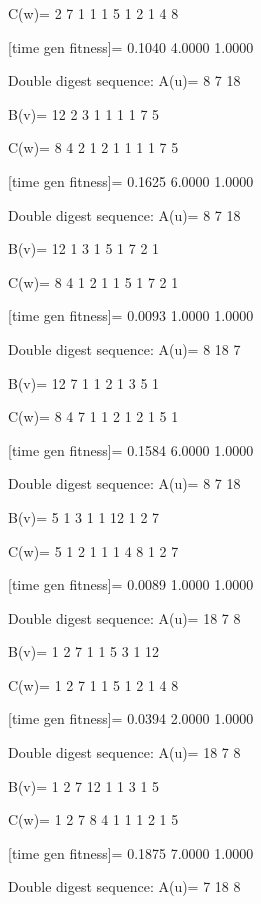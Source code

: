 C(w)=
     2     7     1     1     1     5     1     2     1     4     8

[time gen fitness]=
    0.1040    4.0000    1.0000

Double digest sequence:
A(u)=
     8     7    18

B(v)=
    12     2     3     1     1     1     1     7     5

C(w)=
     8     4     2     1     2     1     1     1     1     7     5

[time gen fitness]=
    0.1625    6.0000    1.0000

Double digest sequence:
A(u)=
     8     7    18

B(v)=
    12     1     3     1     5     1     7     2     1

C(w)=
     8     4     1     2     1     1     5     1     7     2     1

[time gen fitness]=
    0.0093    1.0000    1.0000

Double digest sequence:
A(u)=
     8    18     7

B(v)=
    12     7     1     1     2     1     3     5     1

C(w)=
     8     4     7     1     1     2     1     2     1     5     1

[time gen fitness]=
    0.1584    6.0000    1.0000

Double digest sequence:
A(u)=
     8     7    18

B(v)=
     5     1     3     1     1    12     1     2     7

C(w)=
     5     1     2     1     1     1     4     8     1     2     7

[time gen fitness]=
    0.0089    1.0000    1.0000

Double digest sequence:
A(u)=
    18     7     8

B(v)=
     1     2     7     1     1     5     3     1    12

C(w)=
     1     2     7     1     1     5     1     2     1     4     8

[time gen fitness]=
    0.0394    2.0000    1.0000

Double digest sequence:
A(u)=
    18     7     8

B(v)=
     1     2     7    12     1     1     3     1     5

C(w)=
     1     2     7     8     4     1     1     1     2     1     5

[time gen fitness]=
    0.1875    7.0000    1.0000

Double digest sequence:
A(u)=
     7    18     8


